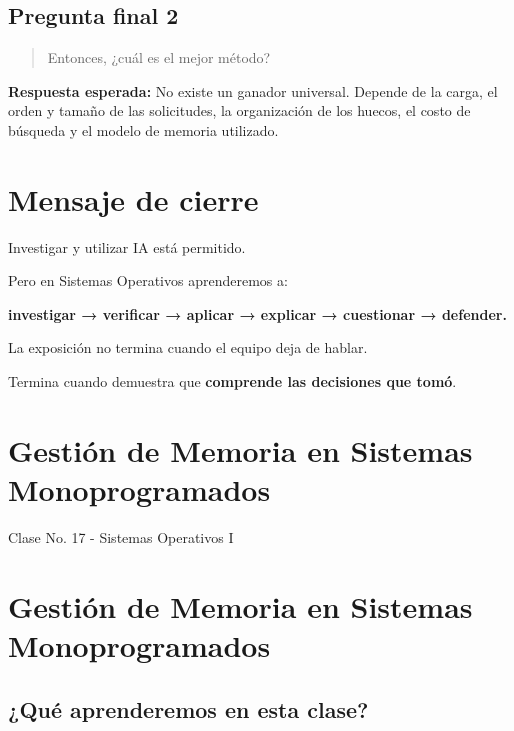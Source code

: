 \documentclass[
  spanish,
  letterpaper,
]{scrbook}
\begin{document}
\section{Pregunta final 2}\label{pregunta-final-2}

\begin{quote}
Entonces, ¿cuál es el mejor método?
\end{quote}

\textbf{Respuesta esperada:} No existe un ganador universal. Depende de
la carga, el orden y tamaño de las solicitudes, la organización de los
huecos, el costo de búsqueda y el modelo de memoria utilizado.


\chapter{Mensaje de cierre}\label{mensaje-de-cierre}

Investigar y utilizar IA está permitido.

Pero en Sistemas Operativos aprenderemos a:

\textbf{investigar → verificar → aplicar → explicar → cuestionar →
defender.}

La exposición no termina cuando el equipo deja de hablar.

Termina cuando demuestra que \textbf{comprende las decisiones que tomó}.


\chapter{Gestión de Memoria en Sistemas
Monoprogramados}\label{gestiuxf3n-de-memoria-en-sistemas-monoprogramados}

Clase No. 17 - Sistemas Operativos I

\hfill\break


\chapter{Gestión de Memoria en Sistemas
Monoprogramados}\label{gestiuxf3n-de-memoria-en-sistemas-monoprogramados-1}

\section{¿Qué aprenderemos en esta
clase?}\label{quuxe9-aprenderemos-en-esta-clase}
\end{document}
